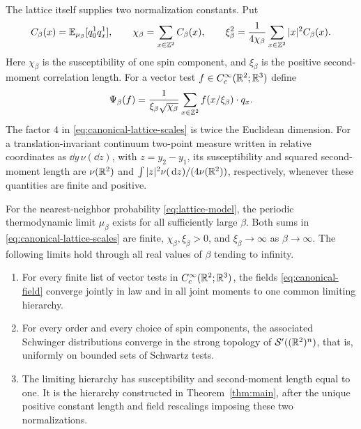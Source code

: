 The lattice itself supplies two normalization constants.  Put
\begin{equation}\label{eq:canonical-lattice-scales}
 C_\beta(x)=\mathbb E_{\mu_\beta}[q_0^1q_x^1],\qquad
 \chi_\beta=\sum_{x\in\mathbb Z^2}C_\beta(x),\qquad
 \xi_\beta^2=\frac{1}{4\chi_\beta}
                 \sum_{x\in\mathbb Z^2}|x|^2 C_\beta(x).
\end{equation}
Here $\chi_\beta$ is the susceptibility of one spin component, and
$\xi_\beta$ is the positive second-moment correlation length.  For a
vector test $f\in C_c^\infty(\mathbb R^2;\mathbb R^3)$ define
\begin{equation}\label{eq:canonical-field}
 \Psi_\beta(f)=\frac{1}{\xi_\beta\sqrt{\chi_\beta}}
           \sum_{x\in\mathbb Z^2} f(x/\xi_\beta)\cdot q_x.
\end{equation}
The factor $4$ in \eqref{eq:canonical-lattice-scales} is twice the Euclidean
dimension.  For a translation-invariant continuum two-point measure
written in relative coordinates as $\dd y\,\nu(\dd z)$, with
$z=y_2-y_1$, its susceptibility and squared second-moment length are
$\nu(\mathbb R^2)$ and $\int|z|^2\nu(\,\mathrm d z)/(4\nu(\mathbb R^2))$, respectively,
whenever these quantities are finite and positive.

\begin{theorem}\label{thm:canonical}
For the nearest-neighbor probability \eqref{eq:lattice-model}, the
periodic thermodynamic limit $\mu_\beta$ exists for all sufficiently
large $\beta$.  Both sums in \eqref{eq:canonical-lattice-scales} are
finite, $\chi_\beta,\xi_\beta>0$, and $\xi_\beta\to\infty$ as
$\beta\to\infty$.  The following limits hold through all real values
of $\beta$ tending to infinity.
\begin{enumerate}[label=\textup{(\roman*)}]
\item For every finite list of vector tests in
$C_c^\infty(\mathbb R^2;\mathbb R^3)$, the fields \eqref{eq:canonical-field} converge
jointly in law and in all joint moments to one common limiting hierarchy.
\item For every order and every choice of spin components, the associated
Schwinger distributions converge in the strong topology of
$\mathcal S'((\mathbb R^2)^n)$, that is, uniformly on bounded sets of Schwartz
tests.
\item The limiting hierarchy has susceptibility and second-moment length
equal to one.  It is the hierarchy constructed in Theorem~\ref{thm:main},
after the unique positive constant length and field rescalings imposing
these two normalizations.
\end{enumerate}
\end{theorem}

